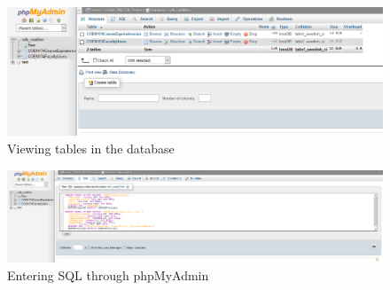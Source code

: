 \documentclass{article}
\begin{document}
\begin{figure}[h]
\includegraphics[width=15cm]{dbview}
\centering
\caption{Viewing tables in the database}
\label{fig:dbview}
\end{figure}

\begin{figure}[h]
\includegraphics[width=15cm]{sql}
\centering
\caption{Entering SQL through phpMyAdmin}
\label{fig:sql}
\end{figure}
\end{document}
